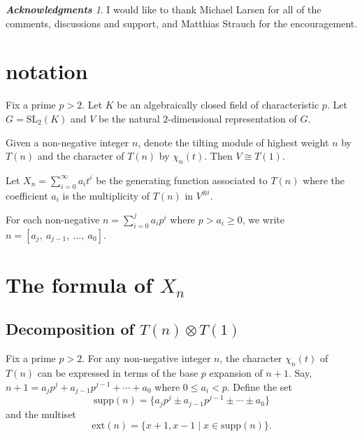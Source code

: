 \documentclass[11 pt]{amsart}
\theoremstyle{plain}
\theoremstyle{definition}
\theoremstyle{remark}
\newtheorem*{thank}{{\bf Acknowledgments}}
\def\SL{\text{SL}}
\def\xx{\otimes}
\def\supp{\text{supp}}
\def\ext{\text{ext}}
\begin{document}
\begin{thank}
    I would like to thank Michael Larsen for all of the comments, discussions and support, and Matthias Strauch for the encouragement. 
\end{thank}






\section{notation}

Fix a prime $p>2$. Let $K$ be an algebraically closed field of characteristic $p$.  Let $G=\SL_2(K)$ and $V$ be the natural  $2$-dimensional representation of $G$.  

Given a non-negative integer $n$, denote the tilting module of highest weight $n$ by $T(n)$ and the character of $T(n)$ by $\chi_n(t)$. Then $V \cong T(1).$ 

Let $X_n=\sum_{i=0}^\infty a_i t^i$ be the generating function associated to $T(n)$ where the coefficient $a_i$ is the multiplicity of $T(n)$ in $V^{\xx i}.$

For each non-negative $n=\sum_{i=0}^j a_ip^i$ where $p>a_i \ge 0$, we write $n=[a_j,\ a_{j-1},\ \ldots,\ a_0].$   

\section{The formula of $X_n$}
 


\subsection{Decomposition of $T(n)\xx T(1)$}

Fix a prime $p>2$. For any non-negative integer $n$, the character $\chi_n(t)$ of $T(n)$ can be expressed in terms of the base $p$ expansion of $n+1$. Say, $n+1=a_j p^j+ a_{j-1}p^{j-1}+\cdots +a_0$ where $0 \le a_i<p$. 
Define the set $$\supp (n)= \{ a_j p^j \pm a_{j-1} p^{j-1} \pm \cdots \pm a_0\}$$ and the multiset $$\ext(n)=\{ x+1, x-1 \mid x \in \supp(n)\}.$$ 

\end{document}
